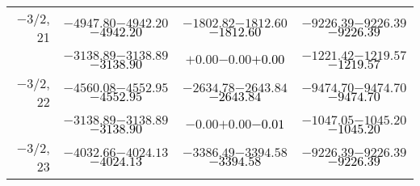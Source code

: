 \documentclass[compress]{beamer}
\begin{document}
\begin{frame}
{\begin{tabular}{r | c | c | c}
$-$3/2, 21 & $-4947.80$\hspace{0.1 cm}$-4942.20$\hspace{0.1 cm}\textcolor{black}{$-4942.20$} & $-1802.82$\hspace{0.1 cm}$-1812.60$\hspace{0.1 cm}\textcolor{black}{$-1812.60$} & $-9226.39$\hspace{0.1 cm}$-9226.39$\hspace{0.1 cm}\textcolor{black}{$-9226.39$} \\
           & $-3138.89$\hspace{0.1 cm}$-3138.89$\hspace{0.1 cm}\textcolor{black}{$-3138.90$} & $+0.00$\hspace{0.1 cm}$-0.00$\hspace{0.1 cm}\textcolor{black}{$+0.00$} & $-1221.42$\hspace{0.1 cm}$-1219.57$\hspace{0.1 cm}\textcolor{black}{$-1219.57$} \\
$-$3/2, 22 & $-4560.08$\hspace{0.1 cm}$-4552.95$\hspace{0.1 cm}\textcolor{black}{$-4552.95$} & $-2634.78$\hspace{0.1 cm}$-2643.84$\hspace{0.1 cm}\textcolor{black}{$-2643.84$} & $-9474.70$\hspace{0.1 cm}$-9474.70$\hspace{0.1 cm}\textcolor{black}{$-9474.70$} \\
           & $-3138.89$\hspace{0.1 cm}$-3138.89$\hspace{0.1 cm}\textcolor{black}{$-3138.90$} & $-0.00$\hspace{0.1 cm}$+0.00$\hspace{0.1 cm}\textcolor{black}{$-0.01$} & $-1047.05$\hspace{0.1 cm}$-1045.20$\hspace{0.1 cm}\textcolor{black}{$-1045.20$} \\
$-$3/2, 23 & $-4032.66$\hspace{0.1 cm}$-4024.13$\hspace{0.1 cm}\textcolor{black}{$-4024.13$} & $-3386.49$\hspace{0.1 cm}$-3394.58$\hspace{0.1 cm}\textcolor{black}{$-3394.58$} & $-9226.39$\hspace{0.1 cm}$-9226.39$\hspace{0.1 cm}\textcolor{black}{$-9226.39$} \\

\end{tabular}}
\end{frame}
\end{document}
